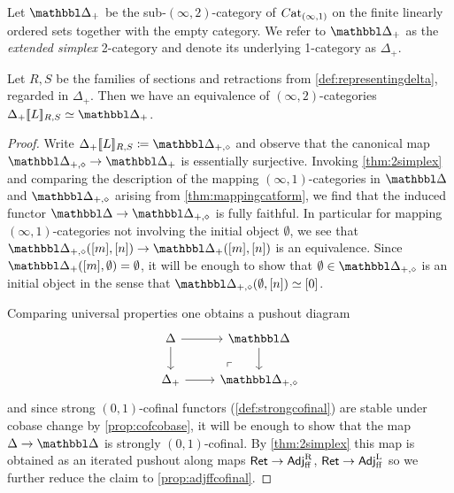 \documentclass[a4paper,reqno,twoside]{amsart}
\begin{document}
\begin{definition}
	Let $\ddelta_+$ be the sub-$(\infty,2)$-category of $\relax{C}\mathrm{at}_{(\infty,1)}$ on the finite linearly ordered sets together with the empty category. We refer to $\ddelta_+$ as the \emph{extended simplex} 2-category and denote its underlying 1-category as $\Delta_+$.
\end{definition}

\begin{corollary}\label{cor:extendeddelta}
	Let $R,S$ be the families of sections and retractions from \cref{def:representingdelta}, regarded in $\Delta_+$.
	Then we have an equivalence of $(\infty,2)$-categories $\Delta_{+}\soft{\cL}_{R,S} \simeq \ddelta_+$.
\end{corollary}
\begin{proof}
	Write $\Delta_{+}\soft{\cL}_{R,S}\coloneq\ddelta_{+,\diamond}$ and observe that the canonical map $\ddelta_{+,\diamond} \to \ddelta_{+}$ is essentially surjective. Invoking \cref{thm:2simplex} and comparing the description of the mapping $(\infty,1)$-categories in $\ddelta$ and $\ddelta_{+,\diamond}$ arising from \cref{thm:mappingcatform}, we find that the induced functor $\ddelta \to \ddelta_{+,\diamond}$ is fully faithful. In particular for mapping $(\infty,1)$-categories not involving the initial object $\emptyset$, we see that $\ddelta_{+,\diamond}([m],[n]) \to \ddelta_{+}([m],[n])$ is an equivalence. Since $\ddelta_{+}([m],\emptyset)=\emptyset$, it will be enough to show that $\emptyset \in \ddelta_{+,\diamond}$ is an initial object in the sense that $\ddelta_{+,\diamond}(\emptyset, [n])\simeq [0]$.
	
	Comparing universal properties one obtains a pushout diagram
	\[
		\begin{tikzcd}
			\Delta \arrow[r] \arrow[d] & \ddelta \arrow[d] \\
			\Delta_+ \arrow[r] & \ddelta_{+,\diamond}
			\arrow[ul, phantom, very near start, "\ulcorner"]
		\end{tikzcd}
	\]
	 and since strong $(0,1)$-cofinal functors (\cref{def:strongcofinal}) are stable under cobase change by \cref{prop:cofcobase}, it will be enough to show that the map $\Delta \to \ddelta$ is strongly $(0,1)$-cofinal. By \cref{thm:2simplex} this map is obtained as an iterated pushout along maps $\mathsf{Ret} \to \mathsf{Adj}^{\operatorname{R}}_{\mathrm{ff}}$, $\mathsf{Ret} \to \mathsf{Adj}^{\operatorname{L}}_{\mathrm{ff}}$ so we further reduce the claim to \cref{prop:adjffcofinal}.
\end{proof}



\end{document}
